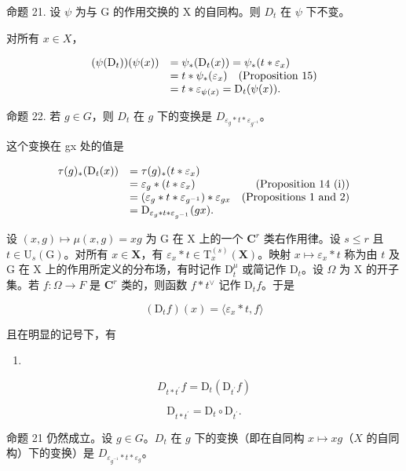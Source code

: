 命题 21. 设 \(\psi\) 为与 G 的作用交换的 X 的自同构。则 \(D_{t}\) 在 \(\psi\) 下不变。

对所有 \(x \in X\)，

\[
\begin{array}{r l} (\psi (\mathrm{D} _ {t})) (\psi (x)) & = \psi_ {*} (\mathrm{D} _ {t} (x)) = \psi_ {*} (t * \varepsilon_ {x}) \\ & = t * \psi_ {*} (\varepsilon_ {x}) \quad \text {(Proposition 15)} \\ & = t * \varepsilon_ {\psi (x)} = \mathrm{D} _ {t} (\psi (x)). \end{array}
\]

命题 22. 若 \(g \in G\)，则 \(D_t\) 在 \(g\) 下的变换是 \(D_{\varepsilon_g * t * \varepsilon_{g^{-1}}}\)。

这个变换在 gx 处的值是

\[
\begin{array}{r l r} \tau (g) _ {*} (\mathrm{D} _ {t} (x)) & = \tau (g) _ {*} (t * \varepsilon_ {x}) \\ & = \varepsilon_ {g} * (t * \varepsilon_ {x}) & \text {(Proposition 14 (i))} \\ & = (\varepsilon_ {g} * t * \varepsilon_ {g^{-1}}) * \varepsilon_ {g x} & \text {(Propositions 1 and 2)} \\ & = \mathrm{D} _ {\varepsilon_ {g} * t * \varepsilon_ {g^{-1}}} (g x). \end{array}
\]

设 \((x,g)\mapsto \mu (x,g) = xg\) 为 G 在 X 上的一个 \(\mathbf{C}^r\) 类右作用律。设 \(s\leqslant r\) 且 \(t\in \mathrm{U}_{s}(\mathrm{G})\)。对所有 \(x\in \mathbf{X}\)，有 \(\varepsilon_{x}*t\in \mathrm{T}_{x}^{(s)}(\mathbf{X})\)。映射 \(x\mapsto \varepsilon_x*t\) 称为由 \(t\) 及 G 在 X 上的作用所定义的分布场，有时记作 \(\mathrm{D}_{t}^{\mu}\) 或简记作 \(\mathrm{D}_t\)。设 \(\Omega\) 为 X 的开子集。若 \(f:\Omega \to F\) 是 \(\mathbf{C}^r\) 类的，则函数 \(f*t^{\vee}\) 记作 \(\mathrm{D}_t f\)。于是

\[
\left(\mathrm{D} _ {t} f\right) (x) = \langle \varepsilon_ {x} * t, f \rangle\tag{19}
\]

且在明显的记号下，有

\begin{enumerate}
\def\labelenumi{(\arabic{enumi})}
\setcounter{enumi}{19}
\tightlist
\item
\end{enumerate}

\[
D _ {t * t ^ {\prime}} f = \mathrm{D} _ {t} (\mathrm{D} _ {t ^ {\prime}} f)\tag{20}
\]

\[
\mathrm{D} _ {t * t ^ {\prime}} = \mathrm{D} _ {t} \circ \mathrm{D} _ {t ^ {\prime}}\tag{21}.
\]

命题 21 仍然成立。设 \(g \in G\)。\(D_t\) 在 \(g\) 下的变换（即在自同构 \(x \mapsto xg\)（\(X\) 的自同构）下的变换）是 \(D_{\varepsilon_{g^{-1}} * t * \varepsilon_g}\)。

